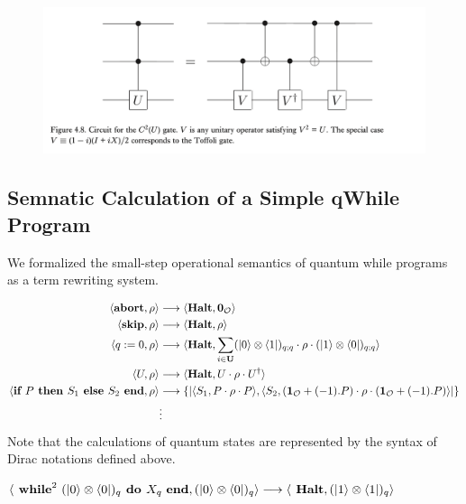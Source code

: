\documentclass[manuscript, review, timestamp]{acmart}
\begin{document}
\begin{figure}[h]
  \includegraphics*[width=\textwidth]{QCQI.Fig4.8.png}
\end{figure}


\subsection{Semnatic Calculation of a Simple qWhile Program}
We formalized the small-step operational semantics of quantum while programs as a term rewriting system.
\begin{definition}
  \begin{align*}
    \langle \textbf{abort}, \rho \rangle &\longrightarrow \langle \textbf{Halt}, \textbf{0}_\mathcal{O} \rangle \\
    \langle \textbf{skip}, \rho \rangle &\longrightarrow \langle \textbf{Halt}, \rho \rangle \\
    \langle q :=0, \rho \rangle &\longrightarrow \langle \textbf{Halt}, \sum_{i \in \textbf{U}} (\ket{0}\otimes\bra{1})_{q;q} \cdot \rho \cdot (\ket{1}\otimes\bra{0})_{q;q} \rangle \\
    \langle U, \rho \rangle & \longrightarrow \langle \textbf{Halt}, U \cdot \rho \cdot U^\dagger \rangle \\
    \langle \textbf{if } P \textbf{ then } S_1 \textbf{ else } S_2 \textbf{ end}, \rho \rangle &\longrightarrow \{| \langle S_1, P \cdot \rho \cdot P \rangle, \langle S_2, (\mathbf{1}_\mathcal{O} + (-1).P) \cdot \rho \cdot (\mathbf{1}_\mathcal{O} + (-1).P)\rangle |\} \\
     & \vdots
  \end{align*}
  Note that the calculations of quantum states are represented by the syntax of Dirac notations defined above.
\end{definition}

\begin{example}
  $\langle \textbf{ while}^2\ (\ket{0}\otimes\bra{0})_q \textbf{ do } X_q\ \textbf{end}, (\ket{0}\otimes\bra{0})_q \rangle \longrightarrow \langle \textbf{ Halt}, (\ket{1}\otimes\bra{1})_q \rangle$
\end{example}
\end{document}
